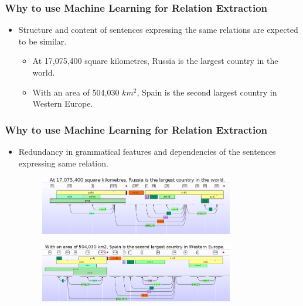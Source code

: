 \documentclass{beamer}
\begin{document}
\begin{frame}
 
 \frametitle{Why to use Machine Learning for Relation Extraction}
 
 \begin{itemize}
  
  \item  Structure and content of sentences expressing the same relations are expected to be similar. 
    
    \begin{itemize}   
	
      \item At 17,075,400 square kilometres, Russia is the largest country in the world.
      \item With an area of 504,030 $km^{2}$, Spain is the second largest country in Western Europe.
      
    \end{itemize}
 \end{itemize}
\end{frame}


\begin{frame}
 \frametitle{Why to use Machine Learning for Relation Extraction}
 
 \begin{itemize}
  \item Redundancy in grammatical features and dependencies of the sentences expressing same relation. \pause
     \begin{figure}
    \centering
    \includegraphics[width = 0.8\textwidth]{images/ex_4}
  \end{figure} \pause
  
   \begin{figure}
    \centering
    \includegraphics[width = 0.8\textwidth]{images/ex_5}
  \end{figure}
  
  
 \end{itemize}

\end{frame}
\end{document}
